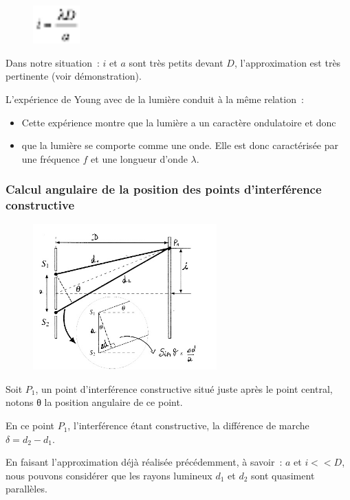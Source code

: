 \begin{figure}
\centering
\includegraphics[width=1.788cm,height=1.46cm]{Pictures/100000010000001A00000015860A63C6525557ED.png}
\caption{}
\end{figure}

Dans notre situation~: $i$ et $a$ sont très petits devant $D$, l'approximation
est très pertinente (voir démonstration).

L'expérience de Young avec de la lumière conduit à la même relation~:
\begin{itemize}
	\item Cette expérience montre que la lumière a un caractère
			ondulatoire et donc 	
	\item que la lumière se comporte comme une onde. Elle est donc caractérisée par
			une fréquence $f$ et une longueur d'onde $\lambda$.
\end{itemize}

\subsubsection{Calcul angulaire de la position des points
d'interférence constructive}

\begin{figure}
\centering
\includegraphics[width=7.071cm,height=5.604cm]{Pictures/10000001000001D8000001766572F750E44C7125.png}
\caption{}
\end{figure}

Soit $P_{1}$, un point d'interférence constructive situé
juste après le point central, notons θ la position angulaire de ce
point.

En ce point $P_{1}$, l'interférence étant constructive, la
différence de marche $\delta= d_{2} - d_1$.

En faisant l'approximation déjà réalisée précédemment, à savoir~: $a$ et $i << D$, nous pouvons considérer que les rayons lumineux $d_1$ et $d_2$ sont
quasiment parallèles.

